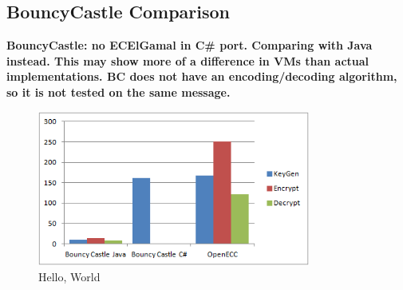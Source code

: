 \subsection{BouncyCastle Comparison}
\label{sec:performance_bouncycastle}

\textbf{BouncyCastle: no ECElGamal in C\# port. Comparing with Java instead. This may show more of a difference in VMs than actual
implementations. BC does not have an encoding/decoding algorithm, so it is not tested on the same message.}

\begin{figure}[htb!]
	\centering
	\includegraphics[width=0.8\textwidth]{performance/bouncycastle-comparison}
	\caption{Hello, World}
	\label{fig:bouncycastle-comparison-graph}
\end{figure}